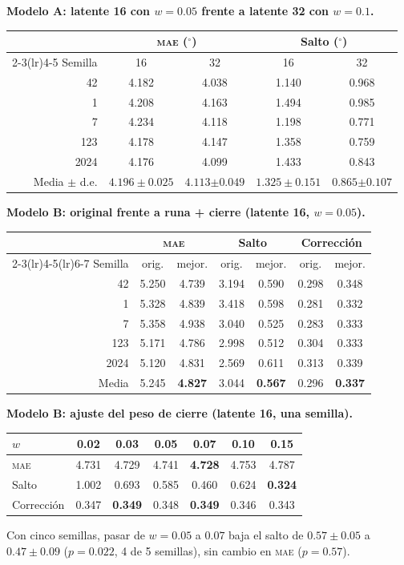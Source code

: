 \documentclass[11pt,a4paper]{article}
\newcommand{\gr}{$^\circ$}
\newcommand{\mae}{\textsc{mae}}
\newcommand{\bpm}[2]{$\mathbf{#1}\boldsymbol{\pm}\mathbf{#2}$}
\begin{document}
\small
\textbf{Modelo A: latente 16 con $w=0.05$ frente a latente 32 con $w=0.1$.}
\begin{center}
\begin{tabular}{rcccc}
\toprule
 & \multicolumn{2}{c}{\mae{} (\gr)} & \multicolumn{2}{c}{Salto (\gr)} \\
\cmidrule(lr){2-3}\cmidrule(lr){4-5}
Semilla & 16 & 32 & 16 & 32 \\
\midrule
42 & 4.182 & 4.038 & 1.140 & 0.968 \\
1 & 4.208 & 4.163 & 1.494 & 0.985 \\
7 & 4.234 & 4.118 & 1.198 & 0.771 \\
123 & 4.178 & 4.147 & 1.358 & 0.759 \\
2024 & 4.176 & 4.099 & 1.433 & 0.843 \\
\midrule
Media $\pm$ d.e. & $4.196\pm0.025$ & \bpm{4.113}{0.049} & $1.325\pm0.151$ & \bpm{0.865}{0.107} \\
\bottomrule
\end{tabular}
\end{center}

\textbf{Modelo B: original frente a runa + cierre (latente 16, $w=0.05$).}
\begin{center}
\begin{tabular}{rcccccc}
\toprule
 & \multicolumn{2}{c}{\mae{}} & \multicolumn{2}{c}{Salto} & \multicolumn{2}{c}{Corrección} \\
\cmidrule(lr){2-3}\cmidrule(lr){4-5}\cmidrule(lr){6-7}
Semilla & orig. & mejor. & orig. & mejor. & orig. & mejor. \\
\midrule
42 & 5.250 & 4.739 & 3.194 & 0.590 & 0.298 & 0.348 \\
1 & 5.328 & 4.839 & 3.418 & 0.598 & 0.281 & 0.332 \\
7 & 5.358 & 4.938 & 3.040 & 0.525 & 0.283 & 0.333 \\
123 & 5.171 & 4.786 & 2.998 & 0.512 & 0.304 & 0.333 \\
2024 & 5.120 & 4.831 & 2.569 & 0.611 & 0.313 & 0.339 \\
\midrule
Media & 5.245 & \textbf{4.827} & 3.044 & \textbf{0.567} & 0.296 & \textbf{0.337} \\
\bottomrule
\end{tabular}
\end{center}

\textbf{Modelo B: ajuste del peso de cierre (latente 16, una semilla).}
\begin{center}
\begin{tabular}{lcccccc}
\toprule
$w$ & 0.02 & 0.03 & 0.05 & 0.07 & 0.10 & 0.15 \\
\midrule
\mae{} & 4.731 & 4.729 & 4.741 & \textbf{4.728} & 4.753 & 4.787 \\
Salto & 1.002 & 0.693 & 0.585 & 0.460 & 0.624 & \textbf{0.324} \\
Corrección & 0.347 & \textbf{0.349} & 0.348 & \textbf{0.349} & 0.346 & 0.343 \\
\bottomrule
\end{tabular}
\end{center}
Con cinco semillas, pasar de $w=0.05$ a $0.07$ baja el salto de $0.57\pm0.05$ a $0.47\pm0.09$ ($p=0.022$, 4 de 5 semillas), sin cambio en \mae{} ($p=0.57$).
\end{document}
